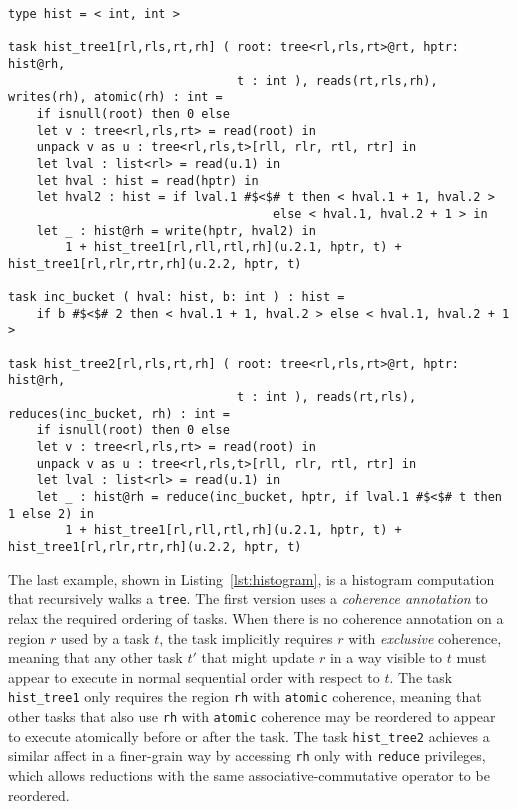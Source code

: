 \begin{lstlisting}[label={lst:histogram},caption={Histogram with Reductions and Atomic Coherence}]
type hist = < int, int >

task hist_tree1[rl,rls,rt,rh] ( root: tree<rl,rls,rt>@rt, hptr: hist@rh, 
                                t : int ), reads(rt,rls,rh), writes(rh), atomic(rh) : int =
    if isnull(root) then 0 else
    let v : tree<rl,rls,rt> = read(root) in
    unpack v as u : tree<rl,rls,t>[rll, rlr, rtl, rtr] in
    let lval : list<rl> = read(u.1) in
    let hval : hist = read(hptr) in
    let hval2 : hist = if lval.1 #$<$# t then < hval.1 + 1, hval.2 >
                                     else < hval.1, hval.2 + 1 > in
    let _ : hist@rh = write(hptr, hval2) in
        1 + hist_tree1[rl,rll,rtl,rh](u.2.1, hptr, t) + hist_tree1[rl,rlr,rtr,rh](u.2.2, hptr, t)

task inc_bucket ( hval: hist, b: int ) : hist =
    if b #$<$# 2 then < hval.1 + 1, hval.2 > else < hval.1, hval.2 + 1 >

task hist_tree2[rl,rls,rt,rh] ( root: tree<rl,rls,rt>@rt, hptr: hist@rh, 
                                t : int ), reads(rt,rls), reduces(inc_bucket, rh) : int =
    if isnull(root) then 0 else
    let v : tree<rl,rls,rt> = read(root) in
    unpack v as u : tree<rl,rls,t>[rll, rlr, rtl, rtr] in
    let lval : list<rl> = read(u.1) in
    let _ : hist@rh = reduce(inc_bucket, hptr, if lval.1 #$<$# t then 1 else 2) in
        1 + hist_tree1[rl,rll,rtl,rh](u.2.1, hptr, t) + hist_tree1[rl,rlr,rtr,rh](u.2.2, hptr, t)
\end{lstlisting}

The last example, shown in Listing~\ref{lst:histogram}, is a histogram
computation that recursively walks a {\tt tree}.  The first version 
uses a {\em coherence annotation} to relax the
required ordering of tasks.  When there is no coherence annotation on
a region $r$ used by a task $t$, the task implicitly requires $r$
with {\em exclusive} coherence, meaning that any other task $t'$ that might
update $r$ in a way visible to $t$ must appear to execute in normal sequential
order with respect to $t$.  The task {\tt hist\_tree1} only requires the region {\tt rh}
with {\tt atomic} coherence, meaning that other tasks that also use {\tt rh} with {\tt atomic} coherence
may be reordered to appear to execute atomically before or after the task.  The task {\tt hist\_tree2} achieves
a similar affect in a finer-grain way by accessing {\tt rh} only with {\tt reduce} privileges, which allows reductions
with the same associative-commutative operator to be reordered.

